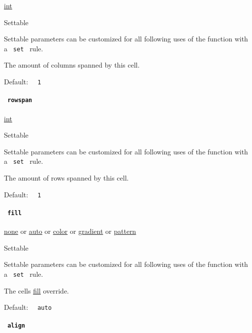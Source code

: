 \href{/docs/reference/foundations/int/}{int}

{{ Settable }}

\label{definitions-cell-colspan-settable-tooltip}
Settable parameters can be customized for all following uses of the
function with a \texttt{\ set\ } rule.

The amount of columns spanned by this cell.

Default: \texttt{\ }{\texttt{\ 1\ }}\texttt{\ }

\paragraph{\texorpdfstring{\texttt{\ rowspan\ }}{ rowspan }}\label{definitions-cell-rowspan}

\href{/docs/reference/foundations/int/}{int}

{{ Settable }}

\label{definitions-cell-rowspan-settable-tooltip}
Settable parameters can be customized for all following uses of the
function with a \texttt{\ set\ } rule.

The amount of rows spanned by this cell.

Default: \texttt{\ }{\texttt{\ 1\ }}\texttt{\ }

\paragraph{\texorpdfstring{\texttt{\ fill\ }}{ fill }}\label{definitions-cell-fill}

\href{/docs/reference/foundations/none/}{none} {or}
\href{/docs/reference/foundations/auto/}{auto} {or}
\href{/docs/reference/visualize/color/}{color} {or}
\href{/docs/reference/visualize/gradient/}{gradient} {or}
\href{/docs/reference/visualize/pattern/}{pattern}

{{ Settable }}

\label{definitions-cell-fill-settable-tooltip}
Settable parameters can be customized for all following uses of the
function with a \texttt{\ set\ } rule.

The cell\textquotesingle s
\href{/docs/reference/model/table/\#parameters-fill}{fill} override.

Default: \texttt{\ }{\texttt{\ auto\ }}\texttt{\ }

\paragraph{\texorpdfstring{\texttt{\ align\ }}{ align }}\label{definitions-cell-align}

